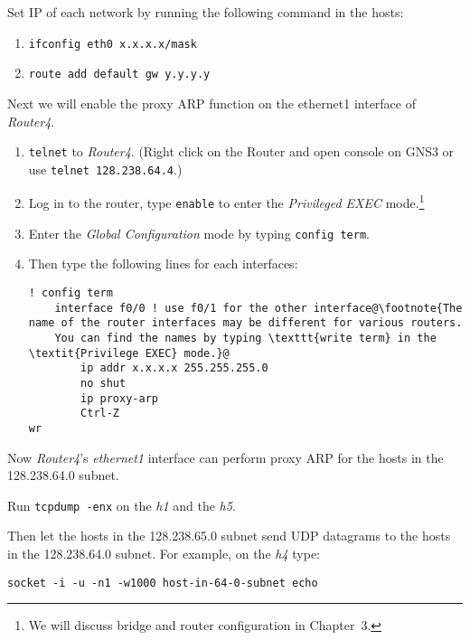 \documentclass{../UTNetLab}
\begin{document}
    Set IP of each network by running the following command in the hosts:
    \begin{enumerate}
        \item \lstinline[emph={x,eth0},morekeywords={[3]masks}]{ifconfig eth0 x.x.x.x/mask}
        \item \lstinline[emph={y},morekeywords={[3]add,default,gw}]{route add default gw y.y.y.y}
    \end{enumerate}
    Next we will enable the proxy ARP function on the ethernet1 interface of \textit{Router4}.
    \begin{enumerate}
        \item \lstinline{telnet} to \textit{Router4}.
                (Right click on the Router and open console on GNS3 or use \lstinline{telnet 128.238.64.4}.)
        \item Log in to the router, type \lstinline[language={cisco}]{enable} to enter the \textit{Privileged EXEC} mode.\footnote{We will discuss bridge and router configuration in Chapter~3.}
        \item Enter the \textit{Global Configuration} mode by typing \lstinline[language={cisco}]{config term}.
        \item Then type the following lines for each interfaces:
        \begin{lstlisting}[language={cisco}, escapechar={@}, emph={x}]
! config term
    interface f0/0 ! use f0/1 for the other interface@\footnote{The name of the router interfaces may be different for various routers.
    You can find the names by typing \texttt{write term} in the \textit{Privilege EXEC} mode.}@
        ip addr x.x.x.x 255.255.255.0
        no shut
        ip proxy-arp
        Ctrl-Z
wr
        \end{lstlisting}
    \end{enumerate}
    
    Now \textit{Router4}’s \textit{ethernet1} interface can perform proxy ARP for the hosts in the 128.238.64.0 subnet.

    Run \lstinline{tcpdump -enx} on the \textit{h1} and the \textit{h5}.

    Then let the hosts in the 128.238.65.0 subnet send UDP datagrams to the hosts in the 128.238.64.0 subnet.
    For example, on the \textit{h4} type:
    \begin{lstlisting}[emph={host-in-64-0-subnet},morekeywords={[3]echo}]
socket -i -u -n1 -w1000 host-in-64-0-subnet echo
    \end{lstlisting}
\end{document}
